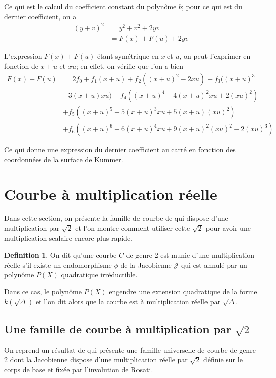 \documentclass[a4paper]{article}
\theoremstyle{definition}
\newtheorem{definition}{Definition}[section]
\theoremstyle{remark}
\numberwithin{equation}{section}
\begin{document}
Ce qui est le calcul du coefficient constant du polynôme $b$; pour ce qui est du dernier coefficient, on a
\begin{align*}
(y+v)^2 &= y^2 + v^2 + 2yv \\
		&= F(x) + F(u) + 2yv
\end{align*}

L'expression $F(x) + F(u)$ étant symétrique en $x$ et $u$, on peut l'exprimer en fonction de $x+u$ et $xu$; en effet, on vérifie que l'on a bien
\begin{align*}
F(x) + F(u) &= 2f_0 + f_1(x+u)+ f_2((x+u)^2 - 2xu) + f_3((x+u)^3 \\ 
			&- 3(x+u)xu) + f_4((x+u)^4 - 4(x+u)^2xu + 2(xu)^2)   \\
			&+ f_5((x+u)^5 - 5(x+u)^3xu+ 5(x+u)(xu)^2) \\
			&+ f_6((x+u)^6 - 6(x+u)^4xu + 9(x+u)^2(xu)^2 - 2 (xu)^3)
\end{align*}

Ce qui donne une expression du dernier coefficient au carré en fonction des coordonnées de la surface de Kummer.

\section{Courbe à multiplication réelle}

Dans cette section, on présente la famille de courbe de \citet{bending} qui dispose d'une multiplication par $\sqrt{2}$ et l'on montre comment utiliser cette $\sqrt{2}$ pour avoir une multiplication scalaire encore plus rapide.

\begin{definition}
On dit qu'une courbe $C$ de genre 2 est munie d'une multiplication réelle s'il existe un endomorphisme $\phi$ de la Jacobienne $\mathcal{J}$ qui est annulé par un polynôme $P(X)$ quadratique irréductible.

Dans ce cas, le polynôme $P(X)$ engendre une extension quadratique de la forme $k(\sqrt\Delta)$ et l'on dit alors que la courbe est à multiplication réelle par $\sqrt\Delta$.
\end{definition}

\subsection{Une famille de courbe à multiplication par $\sqrt{2}$}

On reprend un résultat de \citet{bending} qui présente une famille universelle de courbe de genre 2 dont la Jacobienne dispose d'une multiplication réelle par $\sqrt2$ définie sur le corps de base et fixée par l'involution de Rosati.
\end{document}
